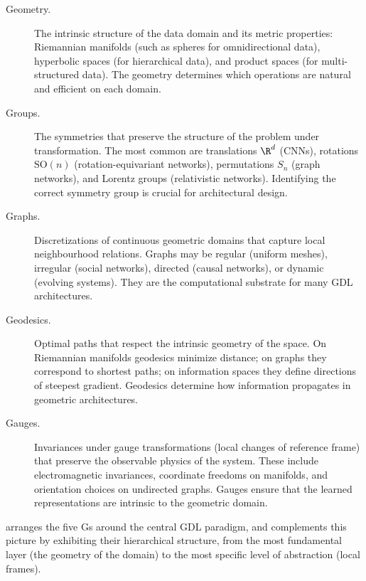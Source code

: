 \begin{description}
\item[Geometry.] The intrinsic structure of the data domain and its metric
properties: Riemannian manifolds (such as spheres for omnidirectional data),
hyperbolic spaces (for hierarchical data), and product spaces (for
multi-structured data). The geometry determines which operations are natural and
efficient on each domain.
\item[Groups.] The symmetries that preserve the structure of the problem under
transformation. The most common are translations $\R^d$ (CNNs), rotations
$\mathrm{SO}(n)$ (rotation-equivariant networks), permutations $S_n$ (graph
networks), and Lorentz groups (relativistic networks). Identifying the correct
symmetry group is crucial for architectural design.
\item[Graphs.] Discretizations of continuous geometric domains that capture
local neighbourhood relations. Graphs may be regular (uniform meshes), irregular
(social networks), directed (causal networks), or dynamic (evolving systems).
They are the computational substrate for many GDL architectures.
\item[Geodesics.] Optimal paths that respect the intrinsic geometry of the
space. On Riemannian manifolds geodesics minimize distance; on graphs they
correspond to shortest paths; on information spaces they define directions of
steepest gradient. Geodesics determine how information propagates in geometric
architectures.
\item[Gauges.] Invariances under gauge transformations (local changes of
reference frame) that preserve the observable physics of the system. These
include electromagnetic invariances, coordinate freedoms on manifolds, and
orientation choices on undirected graphs. Gauges ensure that the learned
representations are intrinsic to the geometric domain.
\end{description}

 arranges the five Gs around the central GDL paradigm,
and  complements this picture by exhibiting their
hierarchical structure, from the most fundamental layer (the geometry of the
domain) to the most specific level of abstraction (local frames).

